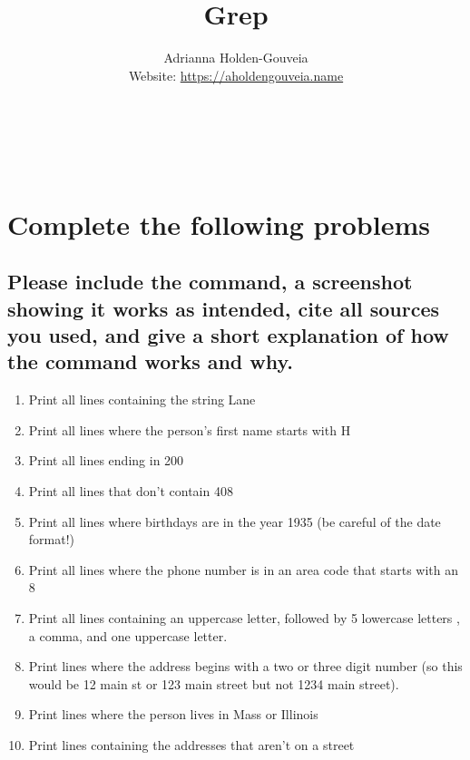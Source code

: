\documentclass[12pt]{article}
\title{Grep}
\author{
        Adrianna Holden-Gouveia \\
        Website: \url{https://aholdengouveia.name}\\
        \date{\vspace{-5ex}} 
        \faLinkedin{: aholdengouveia} \\
        \faGithub {: aholdengouveia} \\
        \faTwitter {: aholdengouveia} \\
        }
\begin{document}
    

\maketitle


\section*{Complete the following problems}

\subsection*{Please include the command, a screenshot showing it works as intended, cite all sources you used, and give a short explanation of how the command works and why.}
    \begin{enumerate}
        \item Print all lines containing the string Lane
        \item Print all lines where the person's first name starts with H
        \item Print all lines ending in 200
        \item Print all lines that don't contain 408
        \item Print all lines where birthdays are in the year 1935 (be careful of the date format!)
        \item Print all lines where the phone number is in an area code that starts with an 8
        \item Print all lines containing an uppercase letter, followed by 5 lowercase letters , a comma, and one uppercase letter.
        \item Print lines where the address begins with a two or three digit number (so this would be 12 main st or 123 main street but not 1234 main street).
        \item Print lines where the person lives in Mass or Illinois
        \item Print lines containing the addresses that aren't on a street


    \end{enumerate}
\end{document}
